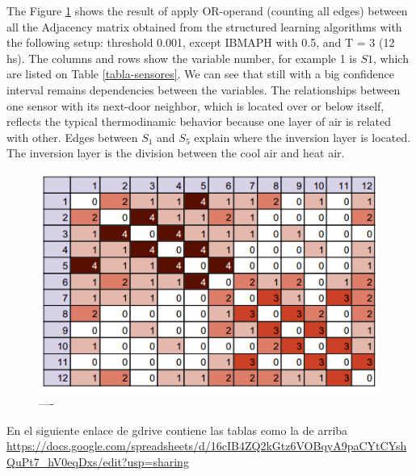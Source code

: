 \documentclass[final,a4paper]{llncs}
\begin{document}
The Figure \ref{fig:T3-result} shows the result of apply OR-operand 
(counting all edges) between all
the Adjacency matrix obtained from the structured learning algorithms with 
the following setup: threshold 0.001, except IBMAPH with 0.5, and T = 3 (12 hs).
The columns and rows show the variable number, for example 1 is $S1$, which 
are listed on Table \ref{tabla-sensores}. We can see that still with a big confidence interval
remains dependencies between the variables. The relationships between one sensor with its next-door neighbor,
which is located over or below itself, reflects the typical thermodinamic behavior 
because one layer of air is related with other. 
Edges between $S_1$ and $S_5$ explain where the inversion layer is located. 
The inversion layer is the division between the cool air and heat air.

\begin{figure}\label{fig:T3-result}
\includegraphics[scale=0.75]{T3-summarize.png}
\caption{----}
\end{figure}

En el siguiente enlace de gdrive contiene las tablas como la de arriba
\url{https://docs.google.com/spreadsheets/d/16cIB4ZQ2kGtz6VOBqyA9paCYtCYshQuPt7_hV0eqDxs/edit?usp=sharing}
\end{document}

